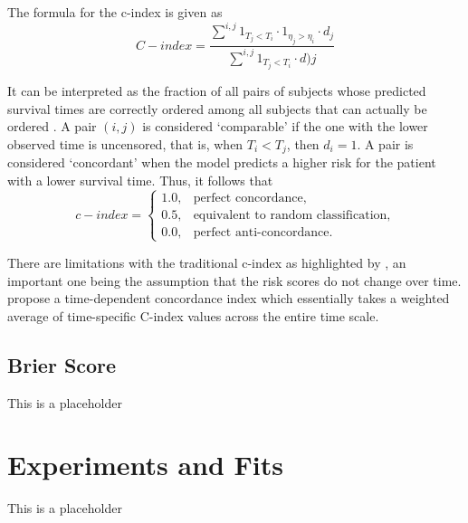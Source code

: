 \documentclass[%
 reprint,
 amsmath,amssymb,
 aps,
]{revtex4-2}
\begin{document}
The formula for the c-index is given as
\[
C-index = \frac{\sum^{i,j} 1_{T_j < T_i}\cdot 1_{\eta_j > \eta_i}\cdot d_j}{\sum^{i,j} 1_{T_j < T_i}\cdot d)j}
\]

It can be interpreted as the fraction of all pairs of subjects whose predicted survival times are correctly ordered among all subjects that can actually be ordered \cite{Pinto_Carvalho_Vinga_2015}. A pair $(i,j)$ is considered `comparable' if the one with the lower observed time is uncensored, that is, when $T_i <T_j$, then $d_i=1$. A pair is considered `concordant' when the model predicts a higher risk for the patient with a lower survival time. Thus, it follows that
\[ c-index = 
\begin{cases}
    1.0, & \text{perfect concordance}, \\
    0.5, & \text{equivalent to random classification}, \\
    0.0, & \text{perfect anti-concordance}.
\end{cases}
\]

There are limitations with the traditional c-index as highlighted by \cite{Hartman_Kim_He_Kalbfleisch_2023}, an important one being the assumption that the risk scores do not change over time. \cite{Heagerty_Zheng_2005} propose a time-dependent concordance index which essentially takes a weighted average of time-specific C-index values across the entire time scale.

\subsection{\label{ibs}Brier Score}
This is a placeholder
\section{\label{exp}Experiments and Fits}
This is a placeholder


\cite{*}

\end{document}
